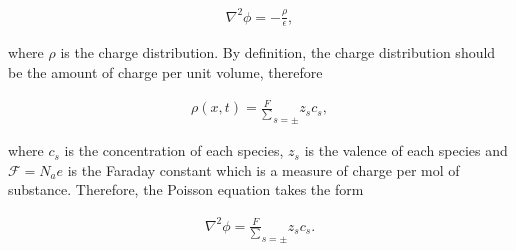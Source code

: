 \begin{align}
	\nabla^2 \phi = -\frac{\rho}{\epsilon},
\end{align}

where $\rho$ is the charge distribution. By definition, the charge distribution should be the amount of charge per unit volume, therefore

\begin{align}
	\rho(x,t) = \frac{F}\sum_{s=\pm} z_sc_s,
\end{align}

where $c_s$ is the concentration of each species, $z_s$ is the valence of each species and $\mathcal{F} = N_ae$ is the Faraday constant which is a measure of charge per mol of substance. Therefore, the Poisson equation takes the form

\begin{align}
	\label{eq:poisson-electrolyte}
	\nabla^2 \phi = \frac{F}\sum_{s=\pm} z_sc_s.
\end{align}














